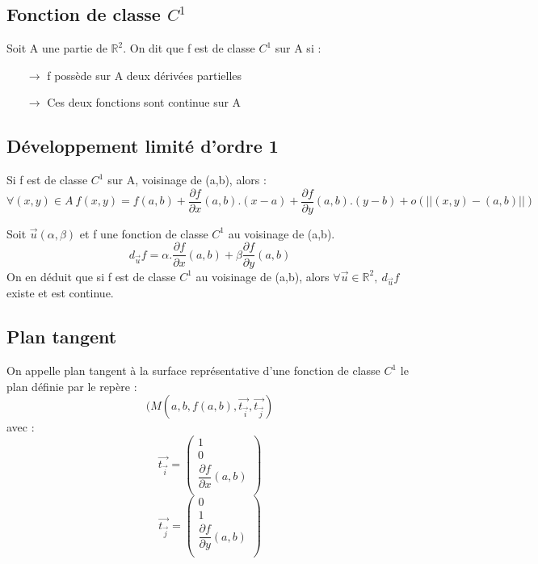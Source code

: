 \subsection{Fonction de classe $C^1$}
\begin{de}
Soit A une partie de $\mathbb{R}^2$. On dit que f est de classe $C^1$ sur A si : 
\begin{itemize}
\item[$\rightarrow$] f possède sur A deux dérivées partielles
 \item[$\rightarrow$] Ces deux fonctions sont continue sur A
\end{itemize}
\end{de}
\subsection{Développement limité d'ordre 1}
Si f est de classe $C^1$ sur A, voisinage de (a,b), alors :
$$\forall(x,y) \in A~ f(x,y) = f(a,b) + \dfrac{\partial f}{\partial x}(a,b).(x-a) + \dfrac{\partial f}{\partial y}(a,b).(y-b) + o(||(x,y)-(a,b)||)$$
\begin{prop}
Soit $\overrightarrow{u}(\alpha,\beta)$ et f une fonction de classe $C^1$ au voisinage de (a,b).
$$d_{\overrightarrow{u}}f = \alpha.\dfrac{\partial f}{\partial x}(a,b) + \beta\dfrac{\partial f}{\partial y}(a,b)$$
On en déduit que si f est de classe $C^1$ au voisinage de (a,b), alors $\forall \overrightarrow{u} \in \mathbb{R}^2,~ d_{\overrightarrow{u}}f$ existe et est continue.
\end{prop}
\subsection{Plan tangent}
\begin{de}
On appelle plan tangent à la surface représentative d'une fonction de classe $C^1$ le plan définie par le repère : 
$$(M(a,b,f(a,b),\overrightarrow{t_{\overrightarrow{i}}},\overrightarrow{t_{\overrightarrow{j}}})$$
avec : 
$$\overrightarrow{t_{\overrightarrow{i}}} =\begin{pmatrix}
  1  \\
  0  \\
  \dfrac{\partial f}{\partial x}(a,b)\\
\end{pmatrix} $$
$$\overrightarrow{t_{\overrightarrow{j}}} =\begin{pmatrix}
  0  \\
  1  \\
  \dfrac{\partial f}{\partial y}(a,b)\\
\end{pmatrix} $$
\end{de}
